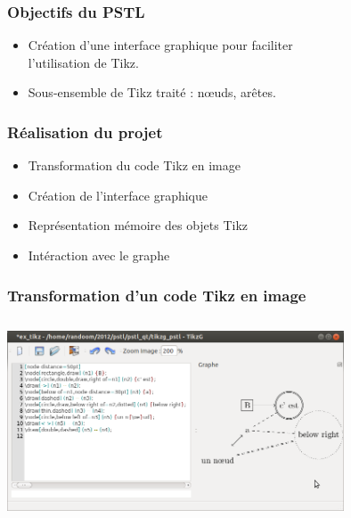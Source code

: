 \documentclass{beamer}
\begin{document}
\begin{frame}
\frametitle{Objectifs du PSTL} 


\begin{itemize}

\item Création d'une interface graphique pour
faciliter\\ l'utilisation de Tikz.

\item Sous-ensemble de Tikz traité : nœuds,
arêtes.

\end{itemize}
\end{frame}

\begin{frame}
\frametitle{Réalisation du projet} 


\begin{itemize}

\item Transformation du code Tikz en image

\item Création de l'interface graphique

\item Représentation mémoire des objets Tikz

\item Intéraction avec le graphe

\end{itemize}

\end{frame}

\begin{frame}
\frametitle{Transformation d'un code Tikz en image}
\centering
\includegraphics[width=10cm, height=6cm]{img/r_1.png}
\end{frame}
\end{document}
